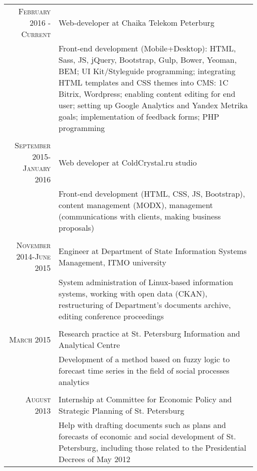 \documentclass[a4paper,10pt]{article} %
\begin{document}
\begin{tabular}{r|p{11cm}}
    \textsc{February 2016 - Current} & Web-developer at Chaika Telekom Peterburg\\
    & \footnotesize{Front-end development (Mobile+Desktop): HTML, Sass, JS, jQuery,
        Bootstrap, Gulp, Bower, Yeoman, BEM; UI Kit/Styleguide programming; 
        integrating HTML templates and CSS themes \protect\linebreak into CMS: 1C Bitrix, Wordpress; 
        enabling content editing for end user; setting up Google Analytics and
        Yandex Metrika goals; implementation of feedback forms; PHP programming}\\
\multicolumn{2}{c}{} \\
    \textsc{September 2015-January 2016} & Web developer at ColdCrystal.ru studio \\
    & \footnotesize{Front-end development (HTML, CSS, JS, Bootstrap), content
management (MODX), management (communications with clients, making business
proposals)}\\
\multicolumn{2}{c}{} \\
    \textsc{November 2014-June 2015} & Engineer at Department of State
Information Systems Management, \protect\linebreak ITMO university \\
    & \footnotesize{System administration of Linux-based information systems,
        working with open data (CKAN), restructuring of Department's documents archive,
        editing conference proceedings}\\
\multicolumn{2}{c}{} \\
\textsc{March 2015} & Research practice at St. Petersburg Information and Analytical Centre \\
                    & \footnotesize{Development of a method based on fuzzy logic to forecast time series in the field of social processes analytics }\\
\multicolumn{2}{c}{} \\


\textsc{August 2013} & Internship at Committee for Economic Policy and Strategic
Planning \protect\linebreak of St. Petersburg \\
& \footnotesize{ Help with drafting documents such as plans and forecasts of
economic and social development \protect\linebreak of St. Petersburg, including those related to
the Presidential Decrees of May 2012 }
\end{tabular}
\end{document}
